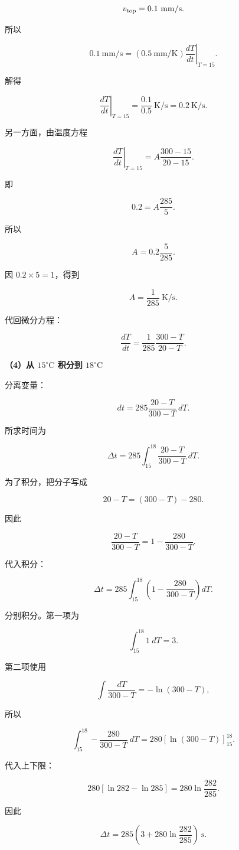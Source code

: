 \documentclass[12pt,a4paper,UTF8]{ctexart}
\begin{document}
\[v_{\rm top}=0.1\ \mathrm{mm/s}.\]

所以

\[0.1\ \mathrm{mm/s}
=(0.5\ \mathrm{mm/K})
\left.\frac{dT}{dt}\right|_{T=15}.\]

解得

\[\left.\frac{dT}{dt}\right|_{T=15}
=\frac{0.1}{0.5}\ \mathrm{K/s}
=0.2\ \mathrm{K/s}.\]

另一方面，由温度方程

\[\left.\frac{dT}{dt}\right|_{T=15}
=A\frac{300-15}{20-15}.\]

即

\[0.2=A\frac{285}{5}.\]

所以

\[A=0.2\frac5{285}.\]

因 \(0.2\times5=1\)，得到

\[\boxed{A=\frac1{285}\ \mathrm{K/s}}.\]

代回微分方程：

\[\boxed{
\frac{dT}{dt}=\frac1{285}\frac{300-T}{20-T}
}.\]

\textbf{（4）从 \(15^\circ\mathrm C\) 积分到 \(18^\circ\mathrm C\)}

分离变量：

\[dt=285\frac{20-T}{300-T}\ dT.\]

所求时间为

\[\Delta t=285\int_{15}^{18}
\frac{20-T}{300-T}\ dT.\]

为了积分，把分子写成

\[20-T=(300-T)-280.\]

因此

\[\frac{20-T}{300-T}
=1-\frac{280}{300-T}.\]

代入积分：

\[\Delta t=285\int_{15}^{18}
\left(1-\frac{280}{300-T}\right)dT.\]

分别积分。第一项为

\[\int_{15}^{18}1\ dT=3.\]

第二项使用

\[\int\frac{dT}{300-T}=-\ln(300-T),\]

所以

\[\int_{15}^{18}-\frac{280}{300-T}\ dT
=280\left[\ln(300-T)\right]_{15}^{18}.\]

代入上下限：

\[280[\ln282-\ln285]
=280\ln\frac{282}{285}.\]

因此

\[\boxed{
\Delta t=285\left(3+280\ln\frac{282}{285}\right)\ \mathrm s
}.\]
\end{document}
